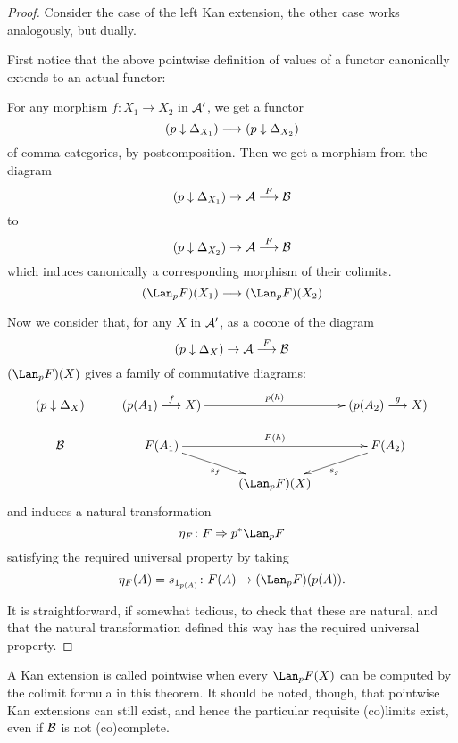   \begin{proof}
    Consider the case of the left Kan extension, the other case works analogously, but dually.

    First notice that the above pointwise definition of values of a functor canonically extends to an actual functor:

    For any morphism $f\colon X_1\to X_2$ in ${\cal A}'$, we get a functor
    \begin{equation*}
      (p\downarrow\Delta_{X_1})\longrightarrow(p\downarrow\Delta_{X_2})
    \end{equation*}
    of comma categories, by postcomposition. Then we get a morphism from the diagram
    \begin{equation*}
      (p\downarrow\Delta_{X_1})\to{\cal A}\stackrel{{F}}{\longrightarrow}{\cal B}
    \end{equation*}
    to
    \begin{equation*}
      (p\downarrow\Delta_{X_2})\to{\cal A}\stackrel{{F}}{\longrightarrow}{\cal B}
    \end{equation*}
    which induces canonically a corresponding morphism of their colimits.
    \begin{equation*}
       (\Lan_pF)(X_1)\To(\Lan_pF)(X_2)
    \end{equation*}

    Now we consider that, for any $X$ in ${\cal A}'$, as a cocone of the diagram
    \begin{equation*}
      (p\downarrow\Delta_X)\to{\cal A}\stackrel{{F}}{\longrightarrow}{\cal B}
    \end{equation*}
    $(\Lan_pF)(X)$ gives a family of commutative diagrams:
      \begin{displaymath}
        \xymatrix@R=0.5cm{
          (p\down\Delta_X)&(p(A_1)\markar{f} X)\ar[rr]^{p(h)}&&(p(A_2)\markar{g} X)\\
          \Bb&F(A_1)\ar[rr]^{F(h)}\ar[dr]_{s_f}&&F(A_2)\ar[dl]^{s_g}\\
          &&(\Lan_pF)(X)&
         }
      \end{displaymath}
      and induces a natural transformation
      \begin{equation*}
        \eta_F\colon F\then p^{\ast}\Lan_pF
      \end{equation*}
      satisfying the required universal property
      by taking
      \begin{equation*}
        \eta_F(A)=s_{1_{p(A)}}\colon F(A)\to(\Lan_pF)(p(A)).
      \end{equation*}

    It is straightforward, if somewhat tedious, to check that these are natural, and that the natural transformation defined this way has the required universal property.
  \end{proof}
  A Kan extension is called pointwise when every $\Lan_pF(X)$ can be computed by the colimit formula in this theorem. It should be noted, though, that pointwise Kan extensions can still exist, and hence the particular requisite (co)limits exist, even if ${\cal B}$ is not (co)complete.


